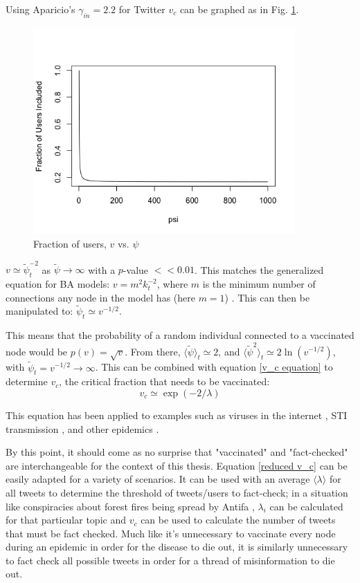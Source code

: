 \documentclass[preprint,review,12pt]{elsarticle}
\begin{document}
Using Aparicio's $\gamma_{in} = 2.2$ for Twitter \cite{aparicio2015model} $v_c$ can be graphed as in Fig. \ref{fig:Fraction of users,v, vs. tildepsi}.
\begin{figure}[h]
 \centering
  \includegraphics[width=10cm]{Fraction of users included.png}
  \caption{Fraction of users, $v$ vs. $\psi$}\label{fig:Fraction of users,v, vs. tildepsi}
 \end{figure}

$v \simeq \tilde{\psi}_t^{-2}$ as $\tilde{\psi} \rightarrow \infty$ with a $p$-value $<< 0.01$. This matches the generalized equation for BA models: $v = m^2k_t^{-2}$, where $m$ is the minimum number of connections any node in the model has (here $m = 1$) \citep{pastor2001epidemic}. This can then be manipulated to: $\tilde{\psi}_t \simeq v^{-1/2}$. 

This means that the probability of a random individual connected to a vaccinated node would be $p(v) = \sqrt{v}$. From there, $\langle \tilde{\psi} \rangle_t \simeq 2$, and $\langle \tilde{\psi}^2 \rangle_t \simeq 2 \ln(v^{-1/2})$, with $\tilde{\psi}_t = v^{-1/2} \rightarrow \infty$. This can be combined with equation \ref{v_c equation} to determine $v_c$, the critical fraction that needs to be vaccinated:
\begin{equation}
\label{reduced v_c} 
    v_c \simeq \exp{(-2/\lambda)}
\end{equation}

This equation has  been applied to examples such as viruses in the internet \citep{kephart1993computers}, STI transmission \citep{anderson1992infectious,lloyd2001viruses}, and other epidemics \citep{diekmann2000mathematical}. 

By this point, it should come as no surprise that "vaccinated" and "fact-checked" are interchangeable for the context of this thesis. Equation \ref{reduced v_c} can be easily adapted for a variety of scenarios. It can be used with an average $\langle \lambda \rangle$ for all tweets to determine the threshold of tweets/users to fact-check; in a situation like conspiracies about forest fires being spread by Antifa \citep{robinson2020oregon}, $\lambda_i$ can be calculated for that particular topic and $v_c$ can be used to calculate the number of tweets that must be fact checked. Much like it's unnecessary to vaccinate every node during an epidemic in order for the disease to die out, it is similarly unnecessary to fact check all possible tweets in order for a thread of misinformation to die out. 
\end{document}
